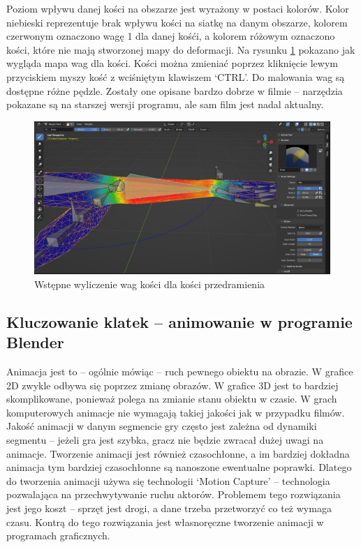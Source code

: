 \documentclass[12pt,twoside]{article}
\begin{document}
Poziom wpływu danej kości na obszarze jest wyrażony w postaci kolorów. Kolor
niebieski reprezentuje brak wpływu kości na siatkę na danym obszarze, kolorem
czerwonym oznaczono wagę 1 dla danej kośći, a kolorem różowym oznaczono kości, które nie mają
stworzonej mapy do deformacji. Na rysunku \ref{Blender:SampleWeightPaint} pokazano jak wygląda mapa wag
dla kości. Kości można zmieniać poprzez kliknięcie lewym przyciskiem myszy kość
z wciśniętym klawiszem `CTRL'. Do malowania wag są dostępne różne pędzle.
Zostały one opisane bardzo dobrze w filmie \cite{blender_WeightPaint_brushes} –
narzędzia pokazane są na starszej wersji programu, ale sam film jest nadal
aktualny.

\begin{figure}[h]
    \centering
    \includegraphics[width=12cm]{BlenderPict/WeightPaint_weights.jpg}
    \caption{Wstępne wyliczenie wag kości dla kości przedramienia}
    \label{Blender:SampleWeightPaint}
\end{figure}



\clearpage
\subsection{Kluczowanie klatek -- animowanie w programie Blender}
Animacja jest to -- ogólnie mówiąc -- ruch pewnego obiektu na obrazie. W grafice
2D zwykle odbywa się poprzez zmianę obrazów. W grafice 3D jest to bardziej
skomplikowane, ponieważ polega na zmianie stanu obiektu w czasie.  W grach komputerowych animacje nie
wymagają takiej jakości jak w przypadku filmów. Jakość animacji w danym
segmencie gry często jest zależna od dynamiki segmentu -- jeżeli gra jest szybka,
gracz nie będzie zwracał dużej uwagi na animacje. Tworzenie animacji jest
również czasochłonne, a im bardziej dokładna animacja tym bardziej czasochłonne
są nanoszone ewentualne poprawki. Dlatego do tworzenia animacji używa się
technologii `Motion Capture' -- technologia pozwalająca na przechwytywanie ruchu
aktorów. Problemem tego rozwiązania jest jego koszt –
sprzęt jest drogi, a dane trzeba przetworzyć co też wymaga czasu. Kontrą do tego
rozwiązania jest własnoręczne tworzenie animacji w programach graficznych. 
\end{document}
